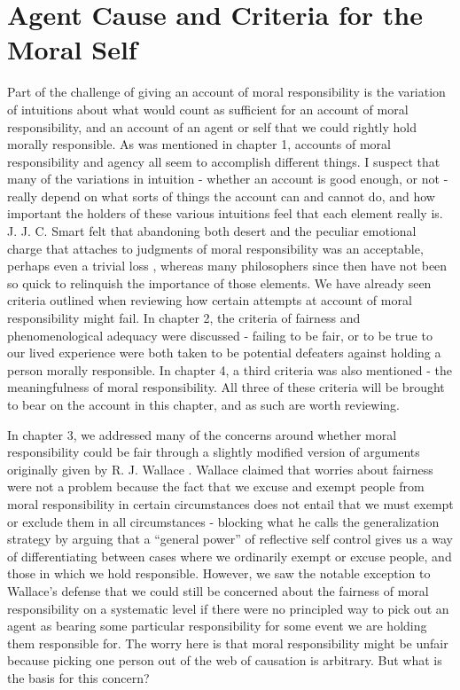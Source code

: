 \documentclass[phd,12pt,oneside,paper=letterpaper]{ubcthesis}
\begin{document}
\section{Agent Cause and Criteria for the Moral Self}
Part of the challenge of giving an account of moral responsibility is the variation of intuitions about what would count as sufficient for an account of moral responsibility, and an account of an agent or self that we could rightly hold morally responsible. As was mentioned in chapter 1, accounts of moral responsibility and agency all seem to accomplish different things. I suspect that many of the variations in intuition - whether an account is good enough, or not - really depend on what sorts of things the account can and cannot do, and how important the holders of these various intuitions feel that each element really is. J. J. C. Smart felt that abandoning both desert and the peculiar emotional charge that attaches to judgments of moral responsibility was an acceptable, perhaps even a trivial loss \citep{smart1961}, whereas many philosophers since then have not been so quick to relinquish the importance of those elements. We have already seen criteria outlined when reviewing how certain attempts at account of moral responsibility might fail. In chapter 2, the criteria of fairness and phenomenological adequacy were discussed - failing to be fair, or to be true to our lived experience were both taken to be potential defeaters against holding a person morally responsible. In chapter 4, a  third criteria was also mentioned - the meaningfulness of moral responsibility. All three of these criteria will be brought to bear on the account in this chapter, and as such are worth reviewing. 

In chapter 3, we addressed many of the concerns around whether moral responsibility could be fair through a slightly modified version of arguments originally given by R. J. Wallace \citep{wallace1994}. Wallace claimed that worries about fairness were not a problem because the fact that we excuse and exempt people from moral responsibility in certain circumstances does not entail that we must exempt or exclude them in all circumstances - blocking what he calls the generalization strategy by arguing that a ``general power'' of reflective self control gives us a way of differentiating between cases where we ordinarily exempt or excuse people, and those in which we hold responsible. However, we saw the notable exception to Wallace's defense that we could still be concerned about the fairness of moral responsibility on a systematic level if there were no principled way to pick out an agent as bearing some particular responsibility for some event we are holding them responsible for.  The worry here is that moral responsibility might be unfair because picking one person out of the web of causation is arbitrary. But what is the basis for this concern?
\end{document}

